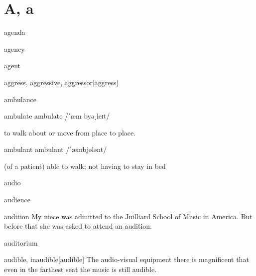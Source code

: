 \section{A, a}

\begin{DefWord}{agenda}
\end{DefWord}

\begin{DefWord}{agency}
\end{DefWord}

\begin{DefWord}{agent}
\end{DefWord}

\begin{DefWord}{aggress, aggressive, aggressor}[aggress]
\end{DefWord}

\begin{DefWord}{ambulance}
\end{DefWord}

\begin{DefWord}{ambulate} 
    ambulate /ˈæm byəˌleɪt/
    
    to walk about or move from place to place.
\end{DefWord}

\begin{DefWord}{ambulant} 
    ambulant /ˈæmbjələnt/
    
    (of a patient) able to walk; not having to stay in bed
\end{DefWord}

\begin{DefWord}{audio}
\end{DefWord}

\begin{DefWord}{audience}
\end{DefWord}

\begin{DefWord}{audition} 
    My  niece  was admitted  to  the Juilliard School of Music  in  America. But before that she was asked to attend an audition.
\end{DefWord}

\begin{DefWord}{auditorium}
\end{DefWord}

\begin{DefWord}{audible, inaudible}[audible]
    The audio-visual equipment there  is  magnificent that even  in the  farthest seat the music is still audible.
\end{DefWord}


